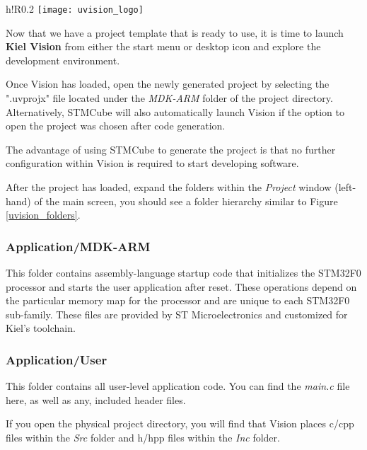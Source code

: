 \documentclass[openany,11pt,fleqn]{book} %
\begin{document}
    \begin{wrapfigure}[8]{h!R}{0.2\textwidth}
    \centering\texttt{[image: uvision\_logo]}
    \label{uvision_logo}
    \end{wrapfigure}

Now that we have a project template that is ready to use, it is time to launch \textbf{Kiel {\textmu}Vision} from either the start menu or desktop icon and explore the development environment. 

Once {\textmu}Vision has loaded, open the newly generated project by selecting the ".uvprojx" file located under the \textit{MDK-ARM} folder of the project directory. Alternatively, STMCube will also automatically launch {\textmu}Vision if the option to open the project was chosen after code generation. 

The advantage of using STMCube to generate the project is that no further configuration within {\textmu}Vision is required to start developing software. 

After the project has loaded, expand the folders within the \textit{Project} window (left-hand) of the main screen, you should see a folder hierarchy similar to Figure \ref{uvision_folders}.

\subsubsection*{Application/MDK-ARM}
This folder contains assembly-language startup code that initializes the STM32F0 processor and starts the user application after reset.  These operations depend on the particular memory map for the processor and are unique to each STM32F0 sub-family. These files are provided by ST Microelectronics and customized for Kiel's toolchain. 

\subsubsection*{Application/User}
This folder contains all user-level application code. You can find the \textit{main.c} file here, as well as any, included header files. 

If you open the physical project directory, you will find that {\textmu}Vision places c/cpp files within the \textit{Src} folder and h/hpp files within the \textit{Inc} folder. 
 
\end{document}

